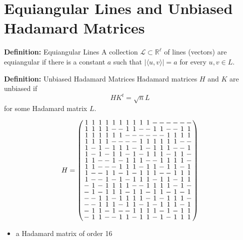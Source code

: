 \documentclass{beamer}
\begin{document}

\section{Equiangular Lines and Unbiased Hadamard Matrices}

\begin{frame}

  \begin{block}{{\bf Definition:} Equiangular Lines}
    A collection $\mathcal{L} \subset \mathbb{R}^\ell$ of lines (vectors) are
    equiangular if there is a constant $a$ such that $|\langle u,v \rangle| = a$ for
    every $u,v \in L$.
  \end{block}

  \begin{block}{{\bf Definition:} Unbiased Hadamard Matrices}
    Hadamard matrices $H$ and $K$ are unbiased if
    \[
      HK^t = \sqrt{n}L
    \]
    for some Hadamard matrix $L$.
  \end{block}
  
\end{frame}

\begin{frame}

  \[
    H=
    \arraycolsep=1.0pt\def\arraystretch{0.75}
    \left(\begin{array}{cccccccccccccccc}
            1&1&1&1&1&1&1&1&1&1&-&-&-&-&-&-\\
            1&1&1&1&-&-&1&1&-&-&1&1&-&-&1&1\\
            1&1&1&1&1&1&-&-&-&-&-&-&1&1&1&1\\
            1&1&1&1&-&-&-&-&1&1&1&1&1&1&-&-\\
            1&-&1&-&1&1&1&-&1&-&1&1&1&-&-&1\\
            1&-&1&-&1&1&-&1&-&1&1&1&-&1&1&-\\
            1&1&-&-&1&-&1&1&1&-&-&1&1&1&1&-\\
            1&1&-&-&-&1&1&1&-&1&1&-&1&1&-&1\\
            1&-&-&1&1&-&1&-&1&1&1&-&-&1&1&1\\
            1&-&-&1&-&1&-&1&1&1&-&1&1&-&1&1\\
            -&1&-&1&1&1&1&-&-&1&1&1&1&-&1&-\\
            -&1&-&1&1&1&-&1&1&-&1&1&-&1&-&1\\
            -&-&1&1&-&1&1&1&1&-&1&-&1&1&1&-\\
            -&-&1&1&1&-&1&1&-&1&-&1&1&1&-&1\\
            -&1&1&-&1&-&-&1&1&1&1&-&1&-&1&1\\
            -&1&1&-&-&1&1&-&1&1&-&1&-&1&1&1\\
          \end{array}\right)
  \]

  \begin{itemize}
  \item a Hadamard matrix of order 16
  \end{itemize}

\end{frame}
\end{document}
